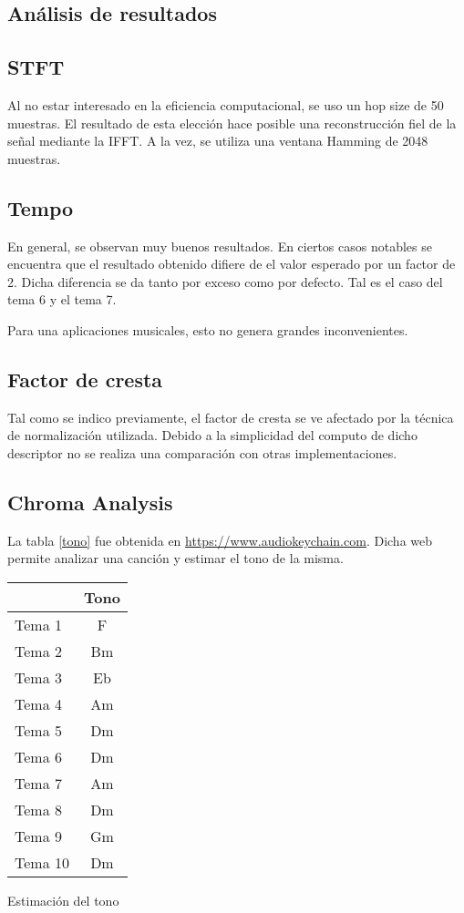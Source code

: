 \documentclass[]{article}
\makeatletter
\newcommand{\tabla}[4]{
\begin{tablehere}
\begin{center}
\begin{tabular}{#1}
#2
\end{tabular}
\caption{#3}
\label{#4}
\end{center}
\end{tablehere}
}
\newenvironment{tablehere}    %
  {\def\@captype{table}}    %

  {}              %
\makeatother
\begin{document}
\begin{multicols}{2}
\section{Análisis de resultados}

\subsection{STFT}
Al no estar interesado en la eficiencia computacional, se uso un hop size de 50
muestras. El resultado de esta elección
hace posible una reconstrucción fiel de la señal mediante la IFFT. A la vez, se
utiliza una ventana Hamming de 2048 muestras.

\subsection{Tempo}
En general, se observan muy buenos resultados. En ciertos casos notables
se encuentra que el resultado obtenido difiere de el valor esperado por un factor
de 2. Dicha diferencia se da tanto por exceso como por defecto.
Tal es el caso del tema 6 y el tema 7.

Para una aplicaciones musicales,
esto no genera grandes inconvenientes.

\subsection{Factor de cresta}
Tal como se indico previamente, el factor de cresta se ve afectado por la técnica
de normalización utilizada. Debido a la simplicidad del computo de dicho descriptor
no se realiza una comparación con otras implementaciones.

\subsection{Chroma Analysis}
La tabla \ref{tono} fue obtenida en \url{https://www.audiokeychain.com}.
Dicha web permite analizar una canción y estimar el tono de la misma.

\tabla
{|l|c|}
{
\hline
 & Tono      \\
 \hline
Tema 1  & F  \\
\hline
Tema 2  & Bm \\
\hline
Tema 3  & Eb \\
\hline
Tema 4  & Am \\
\hline
Tema 5  & Dm \\
\hline
Tema 6  & Dm \\
\hline
Tema 7  & Am \\
\hline
Tema 8  & Dm \\
\hline
Tema 9  & Gm \\
\hline
Tema 10  & Dm \\
\hline
}
{Estimación del tono}
{tono}


\end{multicols}
\end{document}
